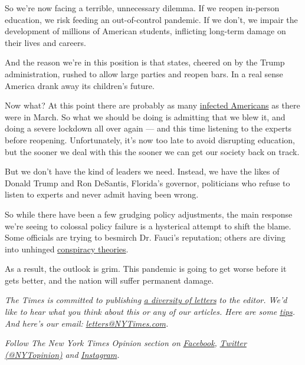 So we're now facing a terrible, unnecessary dilemma. If we reopen
in-person education, we risk feeding an out-of-control pandemic. If we
don't, we impair the development of millions of American students,
inflicting long-term damage on their lives and careers.

And the reason we're in this position is that states, cheered on by the
Trump administration, rushed to allow large parties and reopen bars. In
a real sense America drank away its children's future.

Now what? At this point there are probably as many
\href{https://twitter.com/youyanggu/status/1282028088658976768}{infected
Americans} as there were in March. So what we should be doing is
admitting that we blew it, and doing a severe lockdown all over again
--- and this time listening to the experts before reopening.
Unfortunately, it's now too late to avoid disrupting education, but the
sooner we deal with this the sooner we can get our society back on
track.

But we don't have the kind of leaders we need. Instead, we have the
likes of Donald Trump and Ron DeSantis, Florida's governor, politicians
who refuse to listen to experts and never admit having been wrong.

So while there have been a few grudging policy adjustments, the main
response we're seeing to colossal policy failure is a hysterical attempt
to shift the blame. Some officials are trying to besmirch Dr. Fauci's
reputation; others are diving into unhinged
\href{https://twitter.com/joshtpm/status/1282343525103939586}{conspiracy
theories}.

As a result, the outlook is grim. This pandemic is going to get worse
before it gets better, and the nation will suffer permanent damage.

\emph{The Times is committed to publishing}
\href{https://www.nytimes3xbfgragh.onion/2019/01/31/opinion/letters/letters-to-editor-new-york-times-women.html}{\emph{a
diversity of letters}} \emph{to the editor. We'd like to hear what you
think about this or any of our articles. Here are some}
\href{https://help.nytimes3xbfgragh.onion/hc/en-us/articles/115014925288-How-to-submit-a-letter-to-the-editor}{\emph{tips}}\emph{.
And here's our email:}
\href{mailto:letters@NYTimes.com}{\emph{letters@NYTimes.com}}\emph{.}

\emph{Follow The New York Times Opinion section on}
\href{https://www.facebookcorewwwi.onion/nytopinion}{\emph{Facebook}}\emph{,}
\href{http://twitter.com/NYTOpinion}{\emph{Twitter (@NYTopinion)}}
\emph{and}
\href{https://www.instagram.com/nytopinion/}{\emph{Instagram}}\emph{.}


